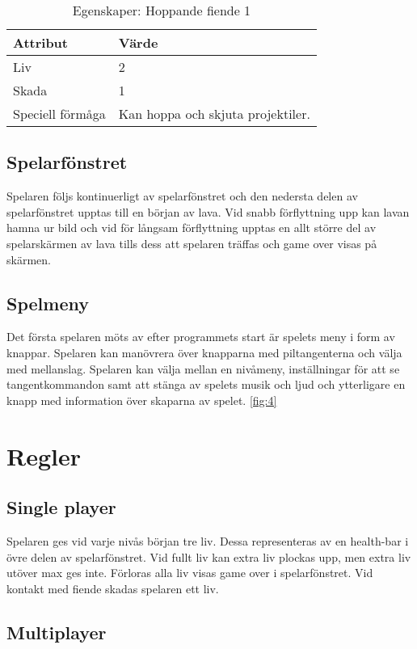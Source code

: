 \documentclass{TDP005mall}
\begin{document}
\begin{table}[h!]
  \centering
  \caption{Egenskaper: Hoppande fiende 1\label{tab:4}}
\begin{tabular}{|l|l|}
\hline
Attribut & Värde \\\hline
Liv & 2 \\\hline
Skada & 1 \\\hline
Speciell förmåga & Kan hoppa och skjuta projektiler. \\\hline
\end{tabular}
\end{table}

\subsection{Spelarfönstret}
Spelaren följs kontinuerligt av spelarfönstret och den nedersta delen av spelarfönstret upptas till en början av lava. Vid snabb förflyttning upp kan lavan hamna ur bild och vid för långsam förflyttning upptas en allt större del av spelarskärmen av lava tills dess att spelaren träffas och game over visas på skärmen.


\subsection{Spelmeny}
Det första spelaren möts av efter programmets start är spelets meny i form av knappar. Spelaren kan manövrera över knapparna med piltangenterna och välja med mellanslag. Spelaren kan välja mellan en nivåmeny, inställningar för att se tangentkommandon samt att stänga av spelets musik och ljud och ytterligare en knapp med information över skaparna av spelet.  \ref{fig:4} 

\section{Regler}%

\subsection{Single player}
Spelaren ges vid varje nivås början tre liv. Dessa representeras av en health-bar i övre delen av spelarfönstret. Vid fullt liv kan extra liv plockas upp, men extra liv utöver max ges inte. Förloras alla liv visas game over i spelarfönstret. Vid kontakt med fiende skadas spelaren ett liv.

\subsection{Multiplayer}
\end{document}
